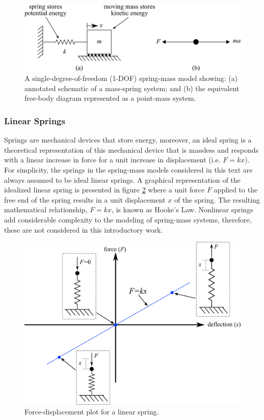 \documentclass[12pt,letter]{article}
\begin{document}
			\begin{figure}[H]
				\centering
				\includegraphics[]{../figures/spring_mass_model_with_point_mass.png}
				\caption{A single-degree-of-freedom (1-DOF) spring-mass model showing: (a) annotated schematic of a mass-spring system; and (b) the equivalent free-body diagram represented as a point-mass system.}
				\label{fig:spring_mass_model_with_point_mass}
			\end{figure}	


					
		\subsubsection{Linear Springs}
	
            Springs are mechanical devices that store energy, moreover, an ideal spring is a theoretical representation of this mechanical device that is massless and responds with a linear increase in force for a unit increase in displacement (i.e. $F=kx$). For simplicity, the springs in the spring-mass models considered in this text are always assumed to be ideal linear springs. A graphical representation of the idealized linear spring is presented in figure \ref{fig:linear_spring_deformation} where a unit force $F$ applied to the free end of the spring results in a unit displacement $x$ of the spring.  The resulting mathematical relationship,  $F=kx$, is known as Hooke's Law. Nonlinear springs add considerable complexity to the modeling of spring-mass systems, therefore, these are not considered in this introductory work. 
			
			\begin{figure}[H]
				\centering
				\includegraphics[]{../figures/linear_spring_deformation.png}
				\caption{Force-displacement plot for a linear spring.}
				\label{fig:linear_spring_deformation}
			\end{figure}					
\end{document}

